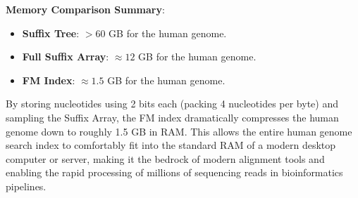 \sta \textbf{Memory Comparison Summary}:
\begin{itemize}
    \item \textbf{Suffix Tree}: \( > 60 \) GB for the human genome.
    \item \textbf{Full Suffix Array}: \( \approx 12 \) GB for the human genome.
    \item \textbf{FM Index}: \( \approx 1.5 \) GB for the human genome.
\end{itemize}
By storing nucleotides using 2 bits each (packing 4 nucleotides per byte) and sampling the Suffix Array, the FM index dramatically compresses the human genome down to roughly 1.5 GB in RAM. This allows the entire human genome search index to comfortably fit into the standard RAM of a modern desktop computer or server, making it the bedrock of modern alignment tools and enabling the rapid processing of millions of sequencing reads in bioinformatics pipelines.
